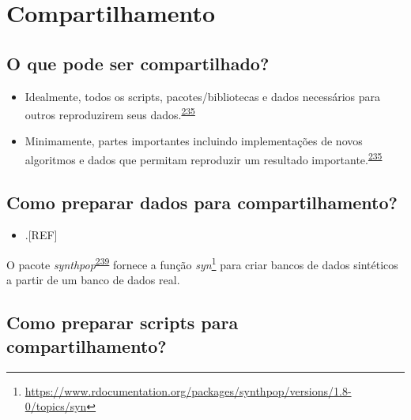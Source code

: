 \documentclass[
  a4paper,
]{book}
\providecommand{\tightlist}{%
  \setlength{\itemsep}{0pt}\setlength{\parskip}{0pt}}
\renewcommand{\href}[2]{#2\footnote{\url{#1}}}
\newenvironment{infobox}[1]
  {
  \begin{itemize}
  \renewcommand{\labelitemi}{
    \raisebox{-.7\height}[0pt][0pt]{
      {\setkeys{Gin}{width=3em,keepaspectratio}
        \texttt{[image: \#1]}}
    }
  }
  \setlength{\fboxsep}{1em}
  \begin{blackbox}
  \item
  }
  {
  \end{blackbox}
  \end{itemize}
  }
\begin{document}
\hypertarget{compartilhamento}{%
\section{Compartilhamento}\label{compartilhamento}}

\hypertarget{o-que-pode-ser-compartilhado}{%
\subsection{O que pode ser compartilhado?}\label{o-que-pode-ser-compartilhado}}

\begin{itemize}
\item
  Idealmente, todos os scripts, pacotes/bibliotecas e dados necessários para outros reproduzirem seus dados.\textsuperscript{\protect\hyperlink{ref-Eglen2017}{235}}
\item
  Minimamente, partes importantes incluindo implementações de novos algoritmos e dados que permitam reproduzir um resultado importante.\textsuperscript{\protect\hyperlink{ref-Eglen2017}{235}}
\end{itemize}

\hypertarget{como-preparar-dados-para-compartilhamento}{%
\subsection{Como preparar dados para compartilhamento?}\label{como-preparar-dados-para-compartilhamento}}

\begin{itemize}
\tightlist
\item
  .{[}REF{]}
\end{itemize}

\begin{infobox}{images/Rlogo}
O pacote \emph{synthpop}\textsuperscript{\protect\hyperlink{ref-synthpop}{239}} fornece a função \href{https://www.rdocumentation.org/packages/synthpop/versions/1.8-0/topics/syn}{\emph{syn}} para criar bancos de dados sintéticos a partir de um banco de dados real.

\end{infobox}

\hypertarget{como-preparar-scripts-para-compartilhamento}{%
\subsection{Como preparar scripts para compartilhamento?}\label{como-preparar-scripts-para-compartilhamento}}
\end{document}
